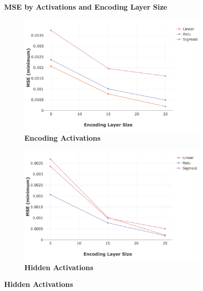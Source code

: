 \documentclass[a4paper,11pt,oneside]{article}
\theoremstyle{plain}
\theoremstyle{definition}
\begin{document}
	
	\begin{figure}[H]
		\centering
		\textbf{MSE by Activations and Encoding Layer Size}
		\begin{subfigure}{.5\textwidth}
			\centering 
			\includegraphics[scale=0.3]{images/results/activations/actual_mse_encoding.png}
			\caption[MSE by Activations and Encoding Layer Size - Encoding Activations]{\textbf{Encoding Activations} 
				\newline }
			\label{figure-actual_mse_encoding_activations}
		\end{subfigure}%
		\begin{subfigure}{.5\textwidth}
			\centering 
			\includegraphics[scale=0.3]{images/results/activations/actual_mse_hidden.png}
			\caption[MSE by Activations and Encoding Layer Size - Hidden Activations]{\textbf{Hidden Activations} 
				\newline }
			\label{figure-actual_mse_hidden_activations}
		\end{subfigure}

\end{figure}
\end{document}
